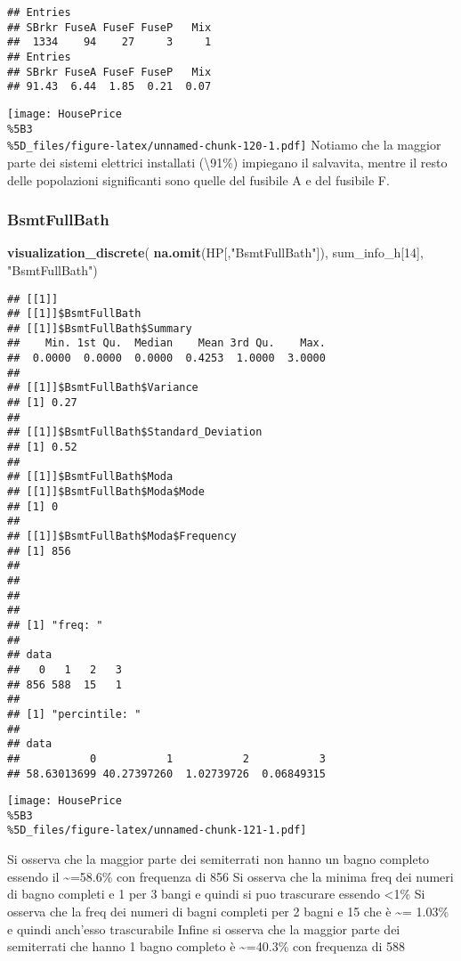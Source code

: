 \documentclass[
]{article}
\newenvironment{Shaded}{\begin{snugshade}}{\end{snugshade}}
\newcommand{\DecValTok}[1]{\textcolor[rgb]{0.00,0.00,0.81}{#1}}
\newcommand{\FunctionTok}[1]{\textcolor[rgb]{0.13,0.29,0.53}{\textbf{#1}}}
\newcommand{\NormalTok}[1]{#1}
\newcommand{\StringTok}[1]{\textcolor[rgb]{0.31,0.60,0.02}{#1}}
\begin{document}
\begin{verbatim}
## Entries
## SBrkr FuseA FuseF FuseP   Mix 
##  1334    94    27     3     1 
## Entries
## SBrkr FuseA FuseF FuseP   Mix 
## 91.43  6.44  1.85  0.21  0.07
\end{verbatim}

\texttt{[image: HousePrice\\\%5B3\\\%5D\_files/figure-latex/unnamed-chunk-120-1.pdf]}
Notiamo che la maggior parte dei sistemi elettrici installati
(\textbackslash91\%) impiegano il salvavita, mentre il resto delle
popolazioni significanti sono quelle del fusibile A e del fusibile F.

\subsubsection{BsmtFullBath}\label{bsmtfullbath}

\begin{Shaded}
\begin{Highlighting}[]
\FunctionTok{visualization\_discrete}\NormalTok{(}
  \FunctionTok{na.omit}\NormalTok{(HP[,}\StringTok{"BsmtFullBath"}\NormalTok{]),}
\NormalTok{  sum\_info\_h[}\DecValTok{14}\NormalTok{],}
  \StringTok{"BsmtFullBath"}\NormalTok{)}
\end{Highlighting}
\end{Shaded}

\begin{verbatim}
## [[1]]
## [[1]]$BsmtFullBath
## [[1]]$BsmtFullBath$Summary
##    Min. 1st Qu.  Median    Mean 3rd Qu.    Max. 
##  0.0000  0.0000  0.0000  0.4253  1.0000  3.0000 
## 
## [[1]]$BsmtFullBath$Variance
## [1] 0.27
## 
## [[1]]$BsmtFullBath$Standard_Deviation
## [1] 0.52
## 
## [[1]]$BsmtFullBath$Moda
## [[1]]$BsmtFullBath$Moda$Mode
## [1] 0
## 
## [[1]]$BsmtFullBath$Moda$Frequency
## [1] 856
## 
## 
## 
## 
## [1] "freq: "
## 
## data
##   0   1   2   3 
## 856 588  15   1 
## 
## [1] "percintile: "
## 
## data
##           0           1           2           3 
## 58.63013699 40.27397260  1.02739726  0.06849315
\end{verbatim}

\texttt{[image: HousePrice\\\%5B3\\\%5D\_files/figure-latex/unnamed-chunk-121-1.pdf]}

Si osserva che la maggior parte dei semiterrati non hanno un bagno
completo essendo il \textasciitilde=58.6\% con frequenza di 856 Si
osserva che la minima freq dei numeri di bagno completi e 1 per 3 bangi
e quindi si puo trascurare essendo \textless1\% Si osserva che la freq
dei numeri di bagni completi per 2 bagni e 15 che è \textasciitilde=
1.03\% e quindi anch'esso trascurabile Infine si osserva che la maggior
parte dei semiterrati che hanno 1 bagno completo è
\textasciitilde=40.3\% con frequenza di 588
\end{document}

